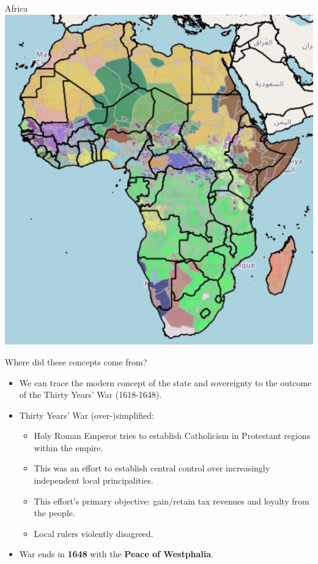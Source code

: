 \documentclass{beamer}
\begin{document}
\begin{frame}{\LARGE Africa}
    \centering
\includegraphics[width=\textwidth,height=0.8\textheight,keepaspectratio]{Africa.JPG}
\end{frame}

\begin{frame}{\LARGE Where did these concepts come from?}
\begin{itemize}
    \item We can trace the modern concept of the state and sovereignty to the outcome of the Thirty Years' War (1618-1648).  \pause
    \item Thirty Years' War (over-)simplified:
    \begin{itemize}
    	\item Holy Roman Emperor tries to establish Catholicism in Protestant regions within the empire.  \pause
    	\item This was an effort to establish central control over increasingly independent local principalities.  \pause 
    	\item This effort's primary objective: gain/retain tax revenues and loyalty from the people.  \pause
    	\item Local rulers violently disagreed.
    \end{itemize}
    \item War ends in \textbf{1648} with the \textbf{Peace of Westphalia}.
\end{itemize}
    
\end{frame}
\end{document}
